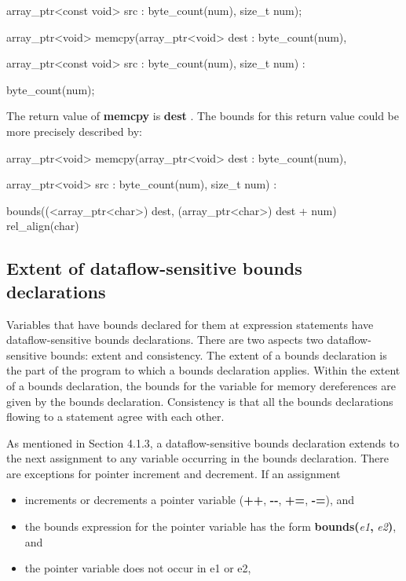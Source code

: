 \documentclass[]{article}
\begin{document}
array\_ptr\textless{}const void\textgreater{} src : byte\_count(num),
size\_t num);

array\_ptr\textless{}void\textgreater{}
memcpy(array\_ptr\textless{}void\textgreater{} dest : byte\_count(num),

array\_ptr\textless{}const void\textgreater{} src : byte\_count(num),
size\_t num) :

byte\_count(num);

The return value of \textbf{memcpy} is \textbf{dest} . The bounds for
this return value could be more precisely described by:

array\_ptr\textless{}void\textgreater{}
memcpy(array\_ptr\textless{}void\textgreater{} dest : byte\_count(num),

array\_ptr\textless{}void\textgreater{} src : byte\_count(num), size\_t
num) :

bounds((\textless{}array\_ptr\textless{}char\textgreater{}) dest,
(array\_ptr\textless{}char\textgreater{}) dest + num) rel\_align(char)

\subsection{\texorpdfstring{\protect\hypertarget{ux5fToc437460764}{}{\protect\hypertarget{ux5fToc440445442}{}{\protect\hypertarget{ux5fToc440449224}{}{\protect\hypertarget{ux5fToc440551874}{}{}}}}Extent
of dataflow-sensitive bounds
declarations}{Extent of dataflow-sensitive bounds declarations}}\label{extent-of-dataflow-sensitive-bounds-declarations}

Variables that have bounds declared for them at expression statements
have dataflow-sensitive bounds declarations. There are two aspects two
dataflow-sensitive bounds: extent and consistency. The extent of a
bounds declaration is the part of the program to which a bounds
declaration applies. Within the extent of a bounds declaration, the
bounds for the variable for memory dereferences are given by the bounds
declaration. Consistency is that all the bounds declarations flowing to
a statement agree with each other.

As mentioned in Section 4.1.3, a dataflow-sensitive bounds declaration
extends to the next assignment to any variable occurring in the bounds
declaration. There are exceptions for pointer increment and decrement.
If an assignment

\begin{itemize}
\item
  increments or decrements a pointer variable (\textbf{++},
  \textbf{-\/-}, \textbf{+=}, \textbf{-=}), and
\item
  the bounds expression for the pointer variable has the form
  \textbf{bounds(}\emph{e1}\textbf{,} \emph{e2}\textbf{)}, and
\item
  the pointer variable does not occur in e1 or e2,
\end{itemize}
\end{document}
